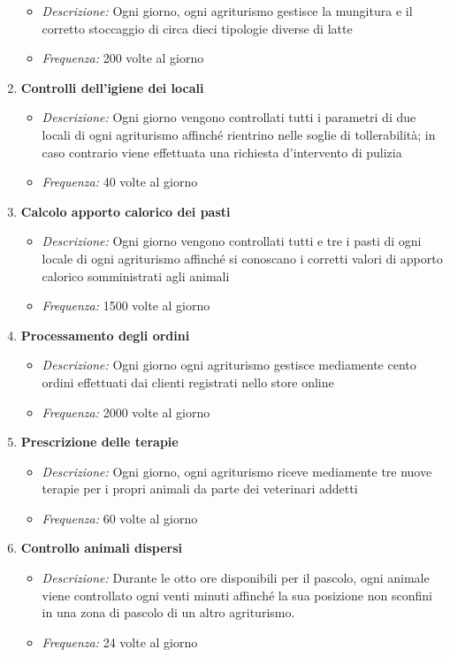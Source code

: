 \documentclass[12pt,a4paper]{article}
\begin{document}
\begin{enumerate}
	\begin{itemize}
	\item \textit{Descrizione: }Ogni giorno, ogni agriturismo gestisce la mungitura e il corretto stoccaggio di circa dieci tipologie diverse di latte
	\item \textit{Frequenza: }200 volte al giorno
	\end{itemize}
\item \textbf{Controlli dell'igiene dei locali}
	\begin{itemize}
	\item \textit{Descrizione: }Ogni giorno vengono controllati tutti i parametri di due locali di ogni agriturismo affinché rientrino nelle soglie di tollerabilità; in caso contrario viene effettuata una richiesta d'intervento di pulizia
	\item \textit{Frequenza: }40 volte al giorno
	\end{itemize}
\item \textbf{Calcolo apporto calorico dei pasti}
	\begin{itemize}
	\item \textit{Descrizione: }Ogni giorno vengono controllati tutti e tre i pasti di ogni locale di ogni agriturismo affinché si conoscano i corretti valori di apporto calorico somministrati agli animali
	\item \textit{Frequenza: }1500 volte al giorno
	\end{itemize}
\item \textbf{Processamento degli ordini}
	\begin{itemize}
	\item \textit{Descrizione: }Ogni giorno ogni agriturismo gestisce mediamente cento ordini effettuati dai clienti registrati nello store online
	\item \textit{Frequenza: }2000 volte al giorno
	\end{itemize}
\item \textbf{Prescrizione delle terapie}
	\begin{itemize}
	\item \textit{Descrizione: }Ogni giorno, ogni agriturismo riceve mediamente tre nuove terapie per i propri animali da parte dei veterinari addetti
	\item \textit{Frequenza: }60 volte al giorno
	\end{itemize}
\item \textbf{Controllo animali dispersi}
	\begin{itemize}
	\item \textit{Descrizione: }Durante le otto ore disponibili per il pascolo, ogni animale viene controllato ogni venti minuti affinché la sua posizione non sconfini in una zona di pascolo di un altro agriturismo.
	\item \textit{Frequenza: }24 volte al giorno
	\end{itemize}

\end{enumerate}
\end{document}
